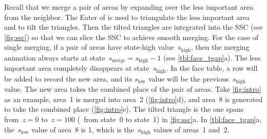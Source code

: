 \documentclass[twocolumn]{svjour3}          %
\begin{document}
Recall that we merge a pair of areas by expanding over 
the less important area from the neighbor.
The Eater of \citet{Suba2014Merge} is used to 
triangulate the less important area and to tilt the triangles.
Then the tilted triangles are integrated into the SSC
(see \fig\ref{fig:ssc})
so that we can slice the SSC to achieve smooth merging.
For the case of single merging,
if a pair of areas have state-high value~$s_\mathrm{high}$,
then the merging animation 
always starts at state~$s_\mathrm{merge}=s_\mathrm{high}-1$
(see \tabl\ref{tbl:face_tgap}a).
The less important area completely disappears
at state~$s_\mathrm{high}$.
In the face table, a row will be added to record the new area, 
and its $s_\mathrm{low}$ value will be the previous~$s_\mathrm{high}$ value.
The new area takes the combined place of the pair of areas.
Take \ref{fig:intro} as an example, 
area~1 is merged into area~2 (\figs\ref{fig:intro}d), 
and area~8 is generated to take the combined place (\figs\ref{fig:intro}e).
The tilted triangle is the one spans 
from~$z= 0$ to~$z=100$ (\ie~from state~0 to state~1)
in \fig\ref{fig:ssc}a.
In \tabl\ref{tbl:face_tgap}a, 
the~$s_\mathrm{low}$ value of area~8 is 1,
which is the~$s_\mathrm{high}$ values of areas~1 and~2.
\end{document}
